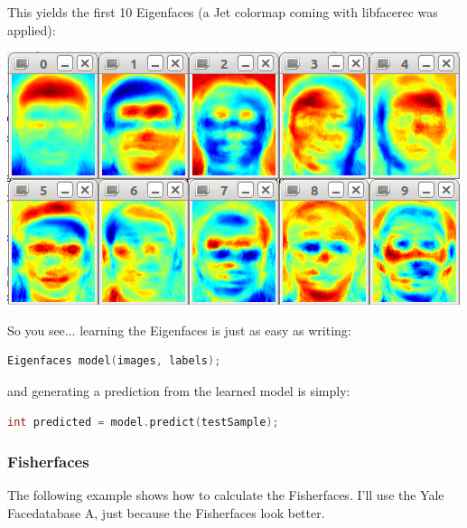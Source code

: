 This yields the first 10 Eigenfaces (a Jet colormap coming with libfacerec was applied):

\begin{center}
	\includegraphics[scale=0.60]{img/libfacerec/eigenfaces_at.png}
\end{center}

So you see... learning the Eigenfaces is just as easy as writing:

\begin{lstlisting}[language=c++]
Eigenfaces model(images, labels);
\end{lstlisting}

and generating a prediction from the learned model is simply:

\begin{lstlisting}[language=c++]
int predicted = model.predict(testSample);
\end{lstlisting}

\subsubsection{Fisherfaces}

The following example shows how to calculate the Fisherfaces. I'll use the Yale Facedatabase A, just because the Fisherfaces look better.


